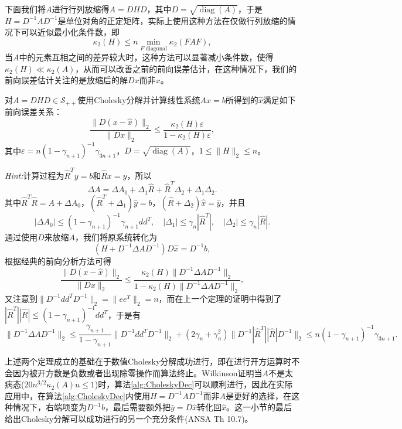 \documentclass[a4paper,10pt]{ctexart}
\begin{document}
下面我们将$ A $进行行列放缩得$ A = DHD $，其中$ D=\sqrt{\operatorname{diag}(A)} $，于是$ H = D^{-1}AD^{-1} $是单位对角的正定矩阵，实际上使用这种方法在仅做行列放缩的情况下可以近似最小化条件数，即
\[
    \kappa_2(H) \leqslant n \min_{F \text{ diagonal}} \kappa_2(FAF),
\]
当$ A $中的元素互相之间的差异较大时，这种方法可以显著减小条件数，使得$ \kappa_2(H)\ll\kappa_2(A) $，从而可以改善之前的前向误差估计，在这种情况下，我们的前向误差估计关注的是放缩后的解$ Dx $而非$ x $。
\begin{theorem}
    对$ A = DHD\in \mathcal{S}_{++} $使用Cholesky分解并计算线性系统$ Ax=b $所得到的$ \hat{x} $满足如下前向误差关系：
    \begin{equation}
        \frac{\| D(x-\hat{x})\|_2}{\| Dx \|_2} \leqslant \frac{\kappa_2(H)\varepsilon}{1-\kappa_2(H)\varepsilon},
    \end{equation}
    其中$ \varepsilon = n(1-\gamma_{n+1})^{-1}\gamma_{3n+1} $，$ D=\sqrt{\operatorname{diag}(A)} $，$ 1\leqslant \| H \|_2 \leqslant n $。
\end{theorem}
\noindent \emph{Hint:}计算过程为$ \hat{R}^Ty=b $和$ \hat{R}x=y $，所以
\[
    \Delta A = \Delta A_0 + \Delta_1 \hat{R} + \hat{R}^T \Delta_2 + \Delta_1 \Delta_2.
\]
其中$ \hat{R}^T\hat{R} = A+\Delta A_0 $，$ (\hat{R}^T+\Delta_1)\hat{y} = b $，$ (\hat{R}+\Delta_2)\hat{x} = \hat{y} $，并且
\[
    |\Delta A_0|\leqslant (1-\gamma_{n+1})^{-1}\gamma_{n+1} dd^T,\quad |\Delta_1| \leqslant \gamma_n |\hat{R}^T|,\quad |\Delta_2|\leqslant \gamma_n|\hat{R}|.
\]
通过使用$ D $来放缩$ A $，我们将原系统转化为
\[
    (H+D^{-1}\Delta A D^{-1})D \hat{x} = D^{-1}b,
\]
根据经典的前向分析方法可得
\[
    \frac{\| D(x-\hat{x}) \|_2}{\| Dx \|_2}\leqslant \frac{\kappa_2(H)\| D^{-1}\Delta A D^{-1} \|_2}{1-\kappa_2(H)\| D^{-1} \Delta A D^{-1} \|_2},
\]
又注意到$ \| D^{-1}d d^T D^{-1} \|_2 = \| e e^T \|_2 = n $，而在上一个定理的证明中得到了$ |\hat{R}^T| |\hat{R}| \leqslant (1-\gamma_{n+1})^{-1} d d^T $，于是有
\[
    \| D^{-1} \Delta A D^{-1} \|_2 \leqslant \frac{\gamma_{n+1}}{1-\gamma_{n+1}}\| D^{-1}d d^T D^{-1} \|_2 + (2\gamma_n+\gamma_n^2)\| D^{-1} |\hat{R}^T| |\hat{R}| D^{-1}\|_2\leqslant n(1-\gamma_{n+1})^{-1}\gamma_{3n+1}.
\]

上述两个定理成立的基础在于数值Cholesky分解成功进行，即在进行开方运算时不会因为被开方数是负数或者出现除零操作而算法终止。Wilkinson证明当$ A $不是太病态($ 20n^{3 / 2}\kappa_2(A)u\leqslant 1 $)时，算法\ref{alg:CholeskyDec}可以顺利进行，因此在实际应用中，在算法\ref{alg:CholeskyDec}内使用$ H = D^{-1}AD^{-1} $而非$ A $是更好的选择，在这种情况下，右端项变为$ D^{-1}b $，最后需要额外把$ \hat{y} = D \hat{x} $转化回$ \hat{x} $。这一小节的最后给出Cholesky分解可以成功进行的另一个充分条件(ANSA Th 10.7)。
\end{document}
